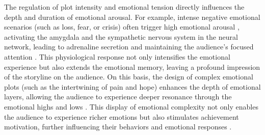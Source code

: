 The regulation of plot intensity and emotional tension directly influences the depth and duration of emotional arousal. For example, intense negative emotional scenarios (such as loss, fear, or crisis) often trigger high emotional arousal \cite{jaaskelainen2020neural}, activating the amygdala and the sympathetic nervous system in the neural network, leading to adrenaline secretion and maintaining the audience's focused attention \cite{panksepp2012archeology, jaaskelainen2020neural}. This physiological response not only intensifies the emotional experience but also extends the emotional memory, leaving a profound impression of the storyline on the audience. On this basis, the design of complex emotional plots (such as the intertwining of pain and hope) enhances the depth of emotional layers, allowing the audience to experience deeper resonance through the emotional highs and lows \cite{leshner2018breast}. This display of emotional complexity not only enables the audience to experience richer emotions but also stimulates achievement motivation, further influencing their behaviors and emotional responses \cite{mar2011emotion, campbell2008hero}.



